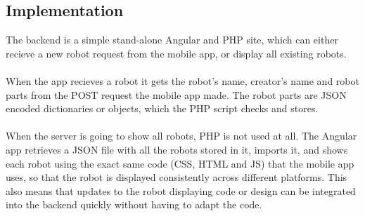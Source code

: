 \subsection{Implementation}
The backend is a simple stand-alone Angular and PHP site, which can either recieve a new robot request from the mobile app, or display all existing robots.
\\
\\
When the app recieves a robot it gets the robot's name, creator's  name and robot parts from the POST request the mobile app made. The robot parts are JSON encoded dictionaries or objects, which the PHP script checks and stores.
\\
\\
When the server is going to show all robots, PHP is not used at all. The Angular app retrieves a JSON file with all the robots stored in it, imports it, and shows each robot using the exact same code (CSS, HTML and JS) that the mobile app uses, so that the robot is displayed consistently across different platforms. This also means that updates to the robot displaying code or design can be integrated into the backend quickly without having to adapt the code.


